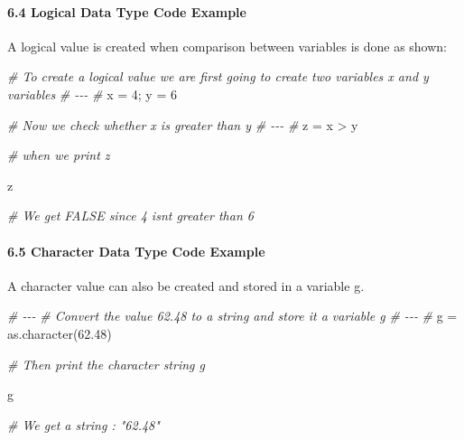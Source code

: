 \documentclass[
]{article}
\newenvironment{Shaded}{\begin{snugshade}}{\end{snugshade}}
\newcommand{\CommentTok}[1]{\textcolor[rgb]{0.56,0.35,0.01}{\textit{#1}}}
\newcommand{\DecValTok}[1]{\textcolor[rgb]{0.00,0.00,0.81}{#1}}
\newcommand{\FloatTok}[1]{\textcolor[rgb]{0.00,0.00,0.81}{#1}}
\newcommand{\FunctionTok}[1]{\textcolor[rgb]{0.00,0.00,0.00}{#1}}
\newcommand{\NormalTok}[1]{#1}
\newcommand{\OtherTok}[1]{\textcolor[rgb]{0.56,0.35,0.01}{#1}}
\newcommand{\SpecialCharTok}[1]{\textcolor[rgb]{0.00,0.00,0.00}{#1}}
\begin{document}
\hypertarget{logical-data-type-code-example}{%
\paragraph{6.4 Logical Data Type Code
Example}\label{logical-data-type-code-example}}

A logical value is created when comparison between variables is done as
shown:

\begin{Shaded}
\begin{Highlighting}[]

\CommentTok{\# To create a logical value we are first going to create two variables x and y variables}
\CommentTok{\# {-}{-}{-}}
\CommentTok{\#}
\NormalTok{x }\OtherTok{=} \DecValTok{4}\NormalTok{;  y }\OtherTok{=} \DecValTok{6}   

\CommentTok{\# Now we check whether x is greater than y}
\CommentTok{\# {-}{-}{-}}
\CommentTok{\# }
\NormalTok{z }\OtherTok{=}\NormalTok{ x }\SpecialCharTok{\textgreater{}}\NormalTok{ y  }

\CommentTok{\# when we print z}

\NormalTok{z}

\CommentTok{\# We get FALSE since 4 isn\textquotesingle{}t greater than 6}

\end{Highlighting}
\end{Shaded}

\hypertarget{character-data-type-code-example}{%
\paragraph{6.5 Character Data Type Code
Example}\label{character-data-type-code-example}}

A character value can also be created and stored in a variable g.

\begin{Shaded}
\begin{Highlighting}[]

\CommentTok{\# {-}{-}{-}}
\CommentTok{\# Convert the value 62.48 to a string and store it a variable g}
\CommentTok{\# {-}{-}{-}}
\CommentTok{\#}
\NormalTok{g }\OtherTok{=} \FunctionTok{as.character}\NormalTok{(}\FloatTok{62.48}\NormalTok{)  }

\CommentTok{\# Then print the character string g}

\NormalTok{g}

\CommentTok{\# We get a string : "62.48"}
\end{Highlighting}
\end{Shaded}
\end{document}
